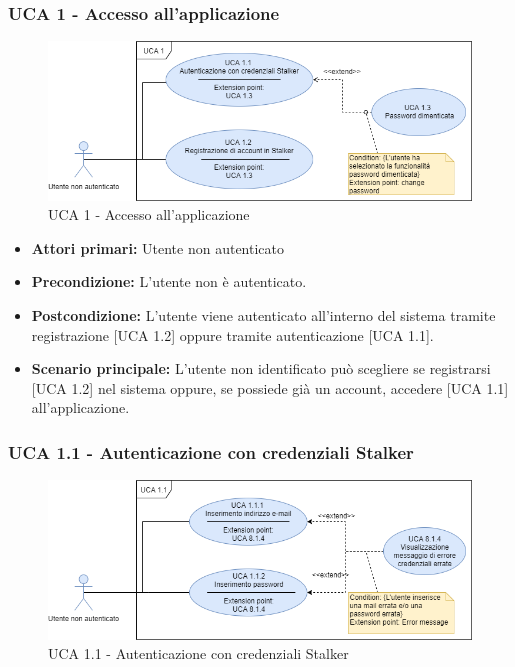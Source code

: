 \subsubsection{UCA 1 - Accesso all'applicazione}%

\begin{figure}[h]
  \centering
    \includegraphics[scale=0.5]{sezioni/UseCase/Immagini/UCA1.png}
  \caption{UCA 1 - Accesso all'applicazione}
\end{figure}

\begin{itemize}
\item \textbf{Attori primari:} Utente non autenticato
\item \textbf{Precondizione:} L'utente non è autenticato.
\item \textbf{Postcondizione:} L'utente viene autenticato all'interno del sistema tramite registrazione [UCA 1.2] oppure tramite autenticazione [UCA 1.1].
\item \textbf{Scenario principale:} L'utente non identificato può scegliere se registrarsi [UCA 1.2] nel sistema oppure, se possiede già un account, accedere [UCA 1.1] all'applicazione. %
\end{itemize}

\subsubsection{UCA 1.1 - Autenticazione con credenziali Stalker}%

\begin{figure}[h]
  \centering
    \includegraphics[scale=0.5, center]{sezioni/UseCase/Immagini/UCA1.1.png}
  \caption{UCA 1.1 - Autenticazione con credenziali Stalker}
\end{figure}


